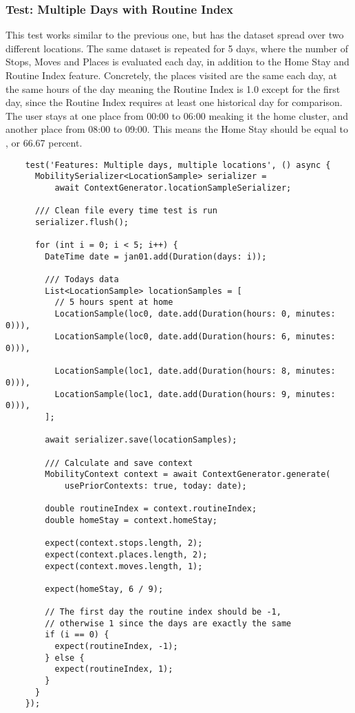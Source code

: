 \subsubsection*{Test: Multiple Days with Routine Index}
This test works similar to the previous one, but has the dataset spread over two different locations. The same dataset is repeated for 5 days, where the number of Stops, Moves and Places is evaluated each day, in addition to the Home Stay and Routine Index feature. Concretely, the places visited are the same each day, at the same hours of the day meaning the Routine Index is 1.0 except for the first day, since the Routine Index requires at least one historical day for comparison. The user stays at one place from 00:00 to 06:00 meaking it the home cluster, and another place from 08:00 to 09:00. This means the Home Stay should be equal to , or 66.67 percent. 

\begin{verbatim}
    test('Features: Multiple days, multiple locations', () async {
      MobilitySerializer<LocationSample> serializer =
          await ContextGenerator.locationSampleSerializer;

      /// Clean file every time test is run
      serializer.flush();

      for (int i = 0; i < 5; i++) {
        DateTime date = jan01.add(Duration(days: i));

        /// Todays data
        List<LocationSample> locationSamples = [
          // 5 hours spent at home
          LocationSample(loc0, date.add(Duration(hours: 0, minutes: 0))),
          LocationSample(loc0, date.add(Duration(hours: 6, minutes: 0))),

          LocationSample(loc1, date.add(Duration(hours: 8, minutes: 0))),
          LocationSample(loc1, date.add(Duration(hours: 9, minutes: 0))),
        ];

        await serializer.save(locationSamples);

        /// Calculate and save context
        MobilityContext context = await ContextGenerator.generate(
            usePriorContexts: true, today: date);

        double routineIndex = context.routineIndex;
        double homeStay = context.homeStay;

        expect(context.stops.length, 2);
        expect(context.places.length, 2);
        expect(context.moves.length, 1);

        expect(homeStay, 6 / 9);

        // The first day the routine index should be -1,
        // otherwise 1 since the days are exactly the same
        if (i == 0) {
          expect(routineIndex, -1);
        } else {
          expect(routineIndex, 1);
        }
      }
    });
\end{verbatim}

